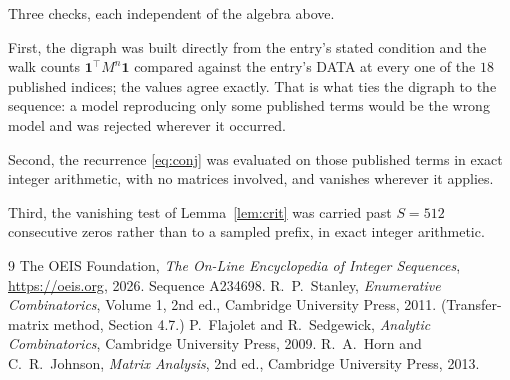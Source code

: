 \documentclass[11pt,a4paper]{article}
\theoremstyle{plain}
\theoremstyle{definition}
\begin{document}
Three checks, each independent of the algebra above.

First, the digraph was built directly from the entry's stated condition and the walk counts
$\mathbf{1}^{\!\top}M^{n}\mathbf{1}$ compared against the entry's DATA at every one of
the $18$ published indices; the values agree exactly. That is what ties the digraph to
the sequence: a model reproducing only some published terms would be the wrong model and
was rejected wherever it occurred.

Second, the recurrence \eqref{eq:conj} was evaluated on those published terms in exact
integer arithmetic, with no matrices involved, and vanishes wherever it applies.

Third, the vanishing test of Lemma~\ref{lem:crit} was carried past $S=512$ consecutive
zeros rather than to a sampled prefix, in exact integer arithmetic.

\begin{thebibliography}{9}
 The OEIS Foundation, \emph{The On-Line Encyclopedia of Integer
Sequences}, \url{https://oeis.org}, 2026. Sequence A234698.
 R.~P.~Stanley, \emph{Enumerative Combinatorics}, Volume 1, 2nd ed.,
Cambridge University Press, 2011. (Transfer-matrix method, Section 4.7.)
 P.~Flajolet and R.~Sedgewick, \emph{Analytic Combinatorics}, Cambridge
University Press, 2009.
 R.~A.~Horn and C.~R.~Johnson, \emph{Matrix Analysis}, 2nd ed., Cambridge
University Press, 2013.
\end{thebibliography}
\end{document}
